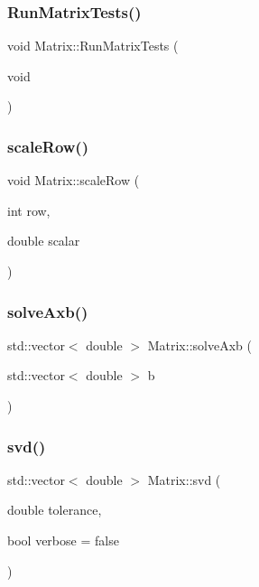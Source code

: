 \mbox{\label{class_matrix_a90d3e687ed2b75462f74b737d891f7ca}} 
\subsubsection{\texorpdfstring{Run\+Matrix\+Tests()}{RunMatrixTests()}}
{\footnotesize\ttfamily void Matrix\+::\+Run\+Matrix\+Tests (\begin{DoxyParamCaption}\item[{void}]{ }\end{DoxyParamCaption})}

\mbox{\label{class_matrix_a37dba2b6d455b7d44ced045ce97a9e05}} 
\subsubsection{\texorpdfstring{scale\+Row()}{scaleRow()}}
{\footnotesize\ttfamily void Matrix\+::scale\+Row (\begin{DoxyParamCaption}\item[{int}]{row,  }\item[{double}]{scalar }\end{DoxyParamCaption})}

\mbox{\label{class_matrix_ae340b61a6f3848f700ba34cd3992d2ab}} 
\subsubsection{\texorpdfstring{solve\+Axb()}{solveAxb()}}
{\footnotesize\ttfamily std\+::vector$<$ double $>$ Matrix\+::solve\+Axb (\begin{DoxyParamCaption}\item[{std\+::vector$<$ double $>$}]{b }\end{DoxyParamCaption})}

\mbox{\label{class_matrix_a9fd5f24302f779d7341fdd06bb23bb90}} 
\subsubsection{\texorpdfstring{svd()}{svd()}}
{\footnotesize\ttfamily std\+::vector$<$ double $>$ Matrix\+::svd (\begin{DoxyParamCaption}\item[{double}]{tolerance,  }\item[{bool}]{verbose = {\ttfamily false} }\end{DoxyParamCaption})}

